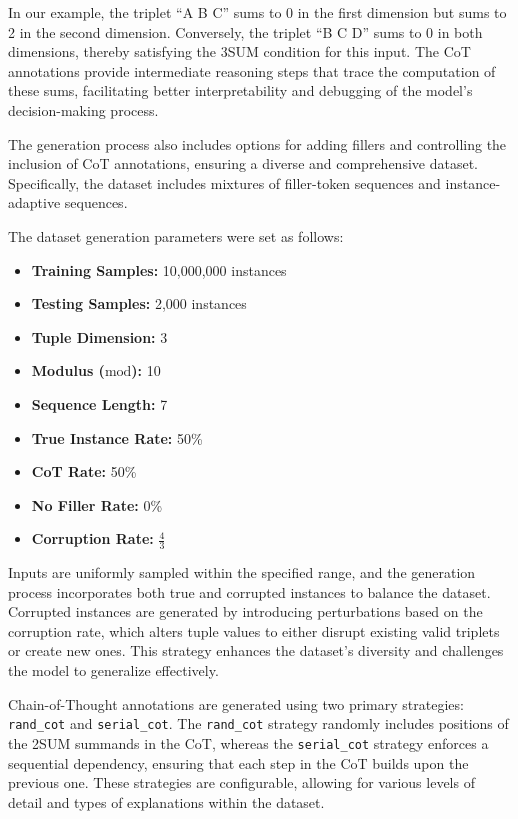 \documentclass{article}
\begin{document}
In our example, the triplet ``A B C'' sums to 0 in the first dimension but sums to 2 in the second dimension. Conversely, the triplet ``B C D'' sums to 0 in both dimensions, thereby satisfying the 3SUM condition for this input. The CoT annotations provide intermediate reasoning steps that trace the computation of these sums, facilitating better interpretability and debugging of the model's decision-making process.

The generation process also includes options for adding fillers and controlling the inclusion of CoT annotations, ensuring a diverse and comprehensive dataset. Specifically, the dataset includes mixtures of filler-token sequences and instance-adaptive sequences.

\newpage
The dataset generation parameters were set as follows:

\begin{itemize}
    \item \textbf{Training Samples:} 10,000,000 instances
    \item \textbf{Testing Samples:} 2,000 instances
    \item \textbf{Tuple Dimension:} 3
    \item \textbf{Modulus (\( \text{mod} \)):} 10
    \item \textbf{Sequence Length:} 7
    \item \textbf{True Instance Rate:} 50\%
    \item \textbf{CoT Rate:} 50\%
    \item \textbf{No Filler Rate:} 0\%
    \item \textbf{Corruption Rate:} \( \frac{4}{3} \)
\end{itemize}

Inputs are uniformly sampled within the specified range, and the generation process incorporates both true and corrupted instances to balance the dataset. Corrupted instances are generated by introducing perturbations based on the corruption rate, which alters tuple values to either disrupt existing valid triplets or create new ones. This strategy enhances the dataset's diversity and challenges the model to generalize effectively.

Chain-of-Thought annotations are generated using two primary strategies: \texttt{rand\_cot} and \texttt{serial\_cot}. The \texttt{rand\_cot} strategy randomly includes positions of the 2SUM summands in the CoT, whereas the \texttt{serial\_cot} strategy enforces a sequential dependency, ensuring that each step in the CoT builds upon the previous one. These strategies are configurable, allowing for various levels of detail and types of explanations within the dataset.
\end{document}

